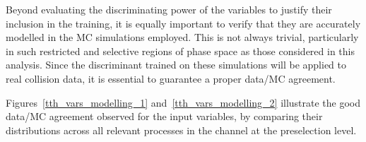 Beyond evaluating the discriminating power of the variables to justify their inclusion in the training, it is equally important to verify that they are accurately modelled in the MC simulations employed. This is not always trivial, particularly in such restricted and selective regions of phase space as those considered in this analysis. Since the discriminant trained on these simulations will be applied to real collision data, it is essential to guarantee a proper data/MC agreement.  

Figures~\ref{tth_vars_modelling_1} and~\ref{tth_vars_modelling_2} illustrate the good data/MC agreement observed for the input variables, by comparing their distributions across all relevant processes in the channel at the \ttH preselection level.

\begin{figure}[htbp]
    \centering
    \setlength{\tabcolsep}{1.5pt}
    \renewcommand{\arraystretch}{0}
  

\end{figure}

